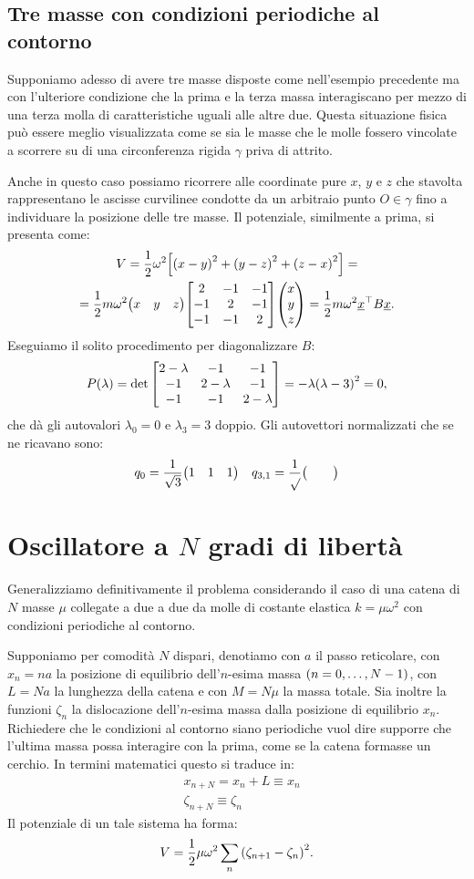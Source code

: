     \subsection{Tre masse con condizioni periodiche al contorno}
        Supponiamo adesso di avere tre masse disposte come nell'esempio precedente ma con l'ulteriore condizione che la prima e la terza massa interagiscano per mezzo di una terza molla di caratteristiche uguali alle altre due. Questa situazione fisica pu\`o essere meglio visualizzata come se sia le masse che le molle fossero vincolate a scorrere su di una circonferenza rigida $\gamma$ priva di attrito.
        \par Anche in questo caso possiamo ricorrere alle coordinate pure $x$, $y$ e $z$ che stavolta rappresentano le ascisse curvilinee condotte da un arbitraio punto $O\in\gamma$ fino a individuare la posizione delle tre masse. Il potenziale, similmente a prima, si presenta come: 
        \begin{multline*}
            V=\frac{1}{2}\omega^2\qty[\qty(x-y)^2+\qty(y-z)^2+\qty(z-x)^2]=\\=\frac{1}{2}m\omega^2\mqty(x & y & z)\mqty[\dmat[-1]{2,2,2}]\mqty(x \\ y \\ z)=\frac{1}{2}m\omega^2\underline{x}^\top B\underline{x}.
        \end{multline*}
        Eseguiamo il solito procedimento per diagonalizzare $B$:
            $$P\qty(\lambda)=\det\mqty[\dmat[-1]{2-\lambda,2-\lambda,2-\lambda}]=-\lambda\qty(\lambda-3)^2=0,$$
        che d\`a gli autovalori $\lambda_0=0$ e $\lambda_3=3$ doppio. Gli autovettori normalizzati che se ne ricavano sono:
            $$q_0=\frac{1}{\sqrt{3}}\mqty(1 & 1 & 1)\quad q_{3,1}=\frac{1}{\sqrt{}}\mqty( & & )$$
\section{Oscillatore a $N$ gradi di libert\`a}\label{s:Ngradi}
    Generalizziamo definitivamente il problema considerando il caso di una catena di $N$ masse $\mu$ collegate a due a due da molle di costante elastica $k=\mu\omega^2$ con condizioni periodiche al contorno.
    \par Supponiamo per comodit\`a $N$ dispari, denotiamo con $a$ il passo reticolare, con $x_n=na$ la posizione di equilibrio dell'$n$-esima massa $\qty(n=0,\dots,N-1)$, con $L=Na$ la lunghezza della catena e con $M=N\mu$ la massa totale. Sia inoltre la funzioni $\zeta_n$ la dislocazione dell'$n$-esima massa dalla posizione di equilibrio $x_n$. Richiedere che le condizioni al contorno siano periodiche vuol dire supporre che l'ultima massa possa interagire con la prima, come se la catena formasse un cerchio. In termini matematici questo si traduce in:
    \begin{align}
        &x_{n+N}=x_n+L\equiv x_n \label{eq:period:1}\\
        &\zeta_{n+N}\equiv \zeta_n \label{eq:period:2}
    \end{align}
    Il potenziale di un tale sistema ha forma:
    \begin{equation}
        V=\frac{1}{2}\mu\omega^2\sum_n\qty(\zeta_{n+1}-\zeta_n)^2.
        \label{eq:potenziale:2}
    \end{equation}
